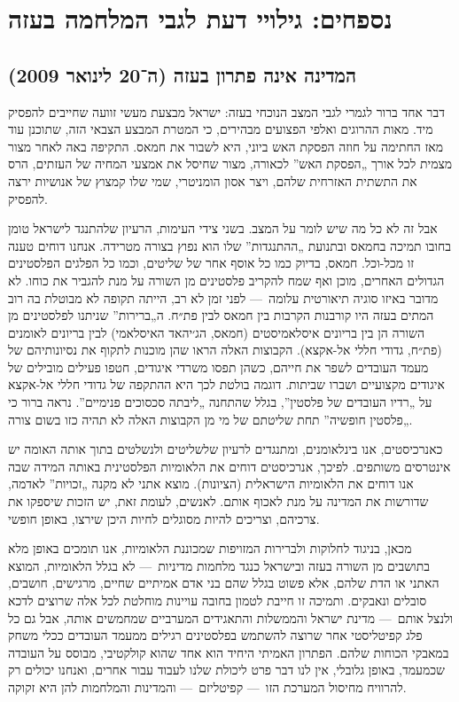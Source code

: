 \section*{נספחים: גילויי דעת לגבי המלחמה בעזה}

\subsection*{המדינה אינה פתרון בעזה (ה־20 לינואר 2009)}

דבר אחד ברור לגמרי לגבי המצב הנוכחי בעזה: ישראל מבצעת מעשי זוועה שחייבים להפסיק מיד. מאות ההרוגים ואלפי הפצועים מבהירים, כי המטרת המבצע הצבאי הזה, שתוכנן עוד מאז החתימה על חוזה הפסקת האש ביוני, היא לשבור את חמאס. התקיפה באה לאחר מצור מצמית לכל אורך „הפסקת האש” לכאורה, מצור שחיסל את אמצעי המחיה של העזתים, הרס את התשתית האזרחית שלהם, ויצר אסון הומניטרי, שמי שלו קמצוץ של אנושיות ירצה להפסיק.

אבל זה לא כל מה שיש לומר על המצב. בשני צידי העימות, הרעיון שלהתנגד לישראל טומן בחובו תמיכה בחמאס ובתנועת „ההתנגדות” שלו הוא נפוץ בצורה מטרידה. אנחנו דוחים טענה זו מכל-וכל. חמאס, בדיוק כמו כל אוסף אחר של שליטים, וכמו כל הפלגים הפלסטינים הגדולים האחרים, מוכן ואף שמח להקריב פלסטינים מן השורה על מנת להגביר את כוחו. לא מדובר באיזו סוגיה תיאורטית עלומה~— לפני זמן לא רב, הייתה תקופה לא מבוטלת בה רוב המתים בעזה היו קורבנות הקרבות בין חמאס לבין פת״ח. ה„ברירות” שניתנו לפלסטינים מן השורה הן בין בריונים איסלאמיסטים (חמאס, הג׳יהאד האיסלאמי) לבין בריונים לאומנים (פת״ח, גדודי חללי אל-אקצא). הקבוצות האלה הראו שהן מוכנות לתקוף את נסיונותיהם של מעמד העובדים לשפר את חייהם, כשהן תפסו משרדי איגודים, חטפו פעילים מובילים של איגודים מקצועיים ושברו שביתות. דוגמה בולטת לכך היא ההתקפה של גדודי חללי אל-אקצא על „רדיו העובדים של פלסטין”, בגלל שהתחנה „ליבתה סכסוכים פנימיים”. נראה ברור כי „פלסטין חופשיה” תחת שליטתם של מי מן הקבוצות האלה לא תהיה כזו בשום צורה.

כאנרכיסטים, אנו בינלאומנים, ומתנגדים לרעיון שלשליטים ולנשלטים בתוך אותה האומה יש אינטרסים משותפים. לפיכך, אנרכיסטים דוחים את הלאומיות הפלסטינית באותה המידה שבה אנו דוחים את הלאומיות הישראלית (הציונות). מוצא אתני לא מקנה „זכויות” לאדמה, שדורשות את המדינה על מנת לאכוף אותם. לאנשים, לעומת זאת, יש הזכות שיספקו את צרכיהם, וצריכים להיות מסוגלים לחיות היכן שירצו, באופן חופשי.

מכאן, בניגוד לחלוקות ולברירות המזויפות שמכוננת הלאומיות, אנו תומכים באופן מלא בתושבים מן השורה בעזה ובישראל כנגד מלחמות מדיניות~— לא בגלל הלאומיות, המוצא האתני או הדת שלהם, אלא פשוט בגלל שהם בני אדם אמיתיים שחיים, מרגישים, חושבים, סובלים ונאבקים. ותמיכה זו חייבת לטמון בחובה עויינות מוחלטת לכל אלה שרוצים לדכא ולנצל אותם~— מדינת ישראל והממשלות והתאגידים המערביים שמחמשים אותה, אבל גם כל פלג קפיטליסטי אחר שרוצה להשתמש בפלסטינים רגילים ממעמד העובדים ככלי משחק במאבקי הכוחות שלהם. הפתרון האמיתי היחיד הוא אחד שהוא קולקטיבי, מבוסס על העובדה שכמעמד, באופן גלובלי, אין לנו דבר פרט ליכולת שלנו לעבוד עבור אחרים, ואנחנו יכולים רק להרוויח מחיסול המערכת הזו~— קפיטליזם~— והמדינות והמלחמות להן היא זקוקה.

